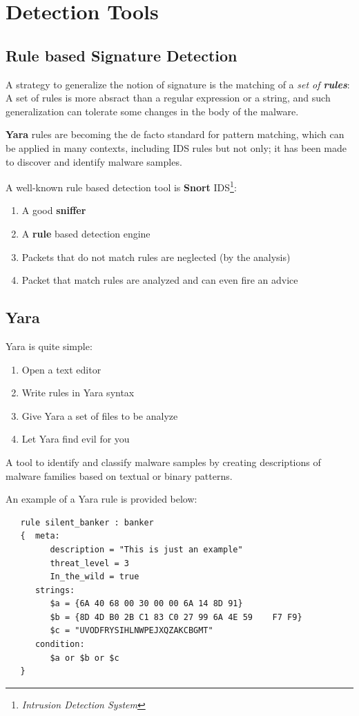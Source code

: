 \chapter{Detection Tools}
\section{Rule based Signature Detection}
A strategy to generalize the notion of signature is the matching of a \textit{set of
\textbf{rules}}:
A set of rules is more absract than a regular expression or a string, and such generalization can tolerate some changes in the body of the malware.

\textbf{Yara} rules are becoming the de facto standard for pattern matching,
which can be applied in many contexts,
including IDS rules but not only;
it has been made to discover and identify malware samples.

A well-known rule based detection tool is \textbf{Snort} IDS\footnote{\textit{Intrusion Detection System}}:
\begin{enumerate}
   \item A good \textbf{sniffer}
   \item A \textbf{rule} based detection engine
   \item Packets that do not match rules are neglected (by the analysis)
   \item Packet that match rules are analyzed and can even fire an advice
\end{enumerate}

\section{Yara}
Yara is quite simple:
\begin{enumerate}
   \item Open a text editor
   \item Write rules in Yara syntax
   \item Give Yara a set of files to be analyze
   \item Let Yara find evil for you
\end{enumerate}

A tool to identify and classify malware samples by creating descriptions of malware families based on textual or binary patterns.

An example of a Yara rule is provided below:
\begin{lstlisting}
   rule silent_banker : banker
   {  meta:
         description = "This is just an example"
         threat_level = 3
         In_the_wild = true
      strings:
         $a = {6A 40 68 00 30 00 00 6A 14 8D 91}
         $b = {8D 4D B0 2B C1 83 C0 27 99 6A 4E 59    F7 F9}
         $c = "UVODFRYSIHLNWPEJXQZAKCBGMT"
      condition:
         $a or $b or $c
   }
\end{lstlisting}

